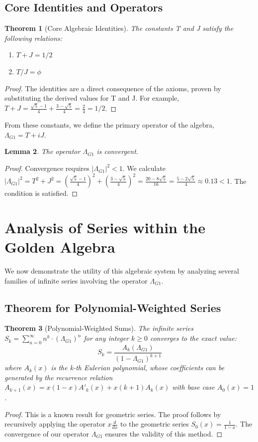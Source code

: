 \documentclass[12pt, letterpaper]{article}
\newtheorem{theorem}{Theorem}[section]
\newtheorem{lemma}[theorem]{Lemma}
\newcommand{\LambdaG}{\Lambda_{G1}}
\begin{document}
\subsection{Core Identities and Operators}
\begin{theorem}[Core Algebraic Identities]
The constants T and J satisfy the following relations:
\begin{enumerate}
    \item $T+J=1/2$ 
    \item $T/J=\phi$ 
\end{enumerate}
\end{theorem}
\begin{proof}
The identities are a direct consequence of the axioms, proven by substituting the derived values for T and J. For example, $T+J=\frac{\sqrt{5}-1}{4}+\frac{3-\sqrt{5}}{4}=\frac{2}{4}=1/2$.
\end{proof}

From these constants, we define the primary operator of the algebra, $\LambdaG = T+iJ$.

\begin{lemma}
The operator $\LambdaG$ is convergent.
\end{lemma}
\begin{proof}
Convergence requires $|\LambdaG|^2 < 1$. We calculate $|\LambdaG|^2 = T^2+J^2 = \left(\frac{\sqrt{5}-1}{4}\right)^2 + \left(\frac{3-\sqrt{5}}{4}\right)^2 = \frac{20-8\sqrt{5}}{16} = \frac{5-2\sqrt{5}}{4} \approx 0.13 < 1$. The condition is satisfied.
\end{proof}

\section{Analysis of Series within the Golden Algebra}
We now demonstrate the utility of this algebraic system by analyzing several families of infinite series involving the operator $\LambdaG$.

\subsection{Theorem for Polynomial-Weighted Series}
\begin{theorem}[Polynomial-Weighted Sums]
The infinite series $S_k = \sum_{n=0}^{\infty} n^k \cdot (\LambdaG)^n$ for any integer $k \ge 0$ converges to the exact value: $$S_k = \frac{A_k(\LambdaG)}{(1-\LambdaG)^{k+1}}$$ where $A_k(x)$ is the k-th Eulerian polynomial, whose coefficients can be generated by the recurrence relation $A_{k+1}(x) = x(1-x)A'_k(x) + x(k+1)A_k(x)$ with base case $A_0(x)=1$.
\end{theorem}
\begin{proof}
This is a known result for geometric series. The proof follows by recursively applying the operator $x \frac{d}{dx}$ to the geometric series $S_0(x) = \frac{1}{1-x}$. The convergence of our operator $\LambdaG$ ensures the validity of this method.
\end{proof}
\end{document}

